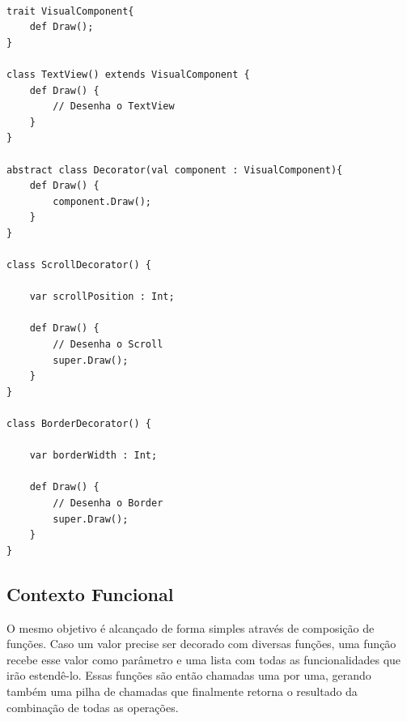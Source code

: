 \begin{lstlisting}[caption={Decorator Orientado a Objetos},label=oodecorator]

trait VisualComponent{
	def Draw();
}

class TextView() extends VisualComponent {
	def Draw() {
		// Desenha o TextView
	}
}

abstract class Decorator(val component : VisualComponent){
	def Draw() {
		component.Draw();
	}
}

class ScrollDecorator() {
	
	var scrollPosition : Int;

	def Draw() {
		// Desenha o Scroll
		super.Draw();
	}
}

class BorderDecorator() {
	
	var borderWidth : Int;

	def Draw() {
		// Desenha o Border
		super.Draw();
	}
}

\end{lstlisting}

\subsection*{Contexto Funcional}

O mesmo objetivo é alcançado de forma simples através de 
composição de funções. Caso um valor precise ser decorado 
com diversas funções, uma função recebe esse valor como 
parâmetro e uma lista com todas as funcionalidades que irão 
estendê-lo. Essas funções são então chamadas uma por uma, 
gerando também uma pilha de chamadas que finalmente 
retorna o resultado da combinação de todas as operações.

\begin{lstlisting}[caption={Decorator Funcional},label=fpdecorator]
    

    
\end{lstlisting}